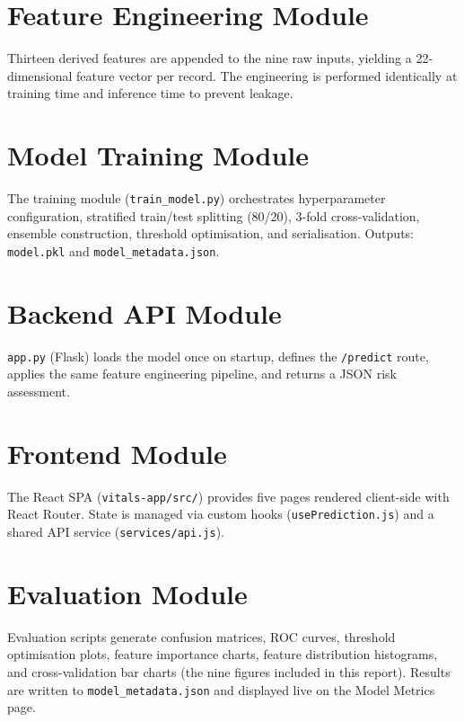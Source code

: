 \documentclass[12pt,a4paper]{report}
\begin{document}
\section{Feature Engineering Module}

Thirteen derived features are appended to the nine raw inputs, yielding a 22-dimensional feature vector per record. The engineering is performed identically at training time and inference time to prevent leakage.

\section{Model Training Module}

The training module (\texttt{train\_model.py}) orchestrates hyperparameter configuration, stratified train/test splitting (80/20), 3-fold cross-validation, ensemble construction, threshold optimisation, and serialisation. Outputs: \texttt{model.pkl} and \texttt{model\_metadata.json}.

\section{Backend API Module}

\texttt{app.py} (Flask) loads the model once on startup, defines the \texttt{/predict} route, applies the same feature engineering pipeline, and returns a JSON risk assessment.

\section{Frontend Module}

The React SPA (\texttt{vitals-app/src/}) provides five pages rendered client-side with React Router. State is managed via custom hooks (\texttt{usePrediction.js}) and a shared API service (\texttt{services/api.js}).

\section{Evaluation Module}

Evaluation scripts generate confusion matrices, ROC curves, threshold optimisation plots, feature importance charts, feature distribution histograms, and cross-validation bar charts (the nine figures included in this report). Results are written to \texttt{model\_metadata.json} and displayed live on the Model Metrics page.

\end{document}
